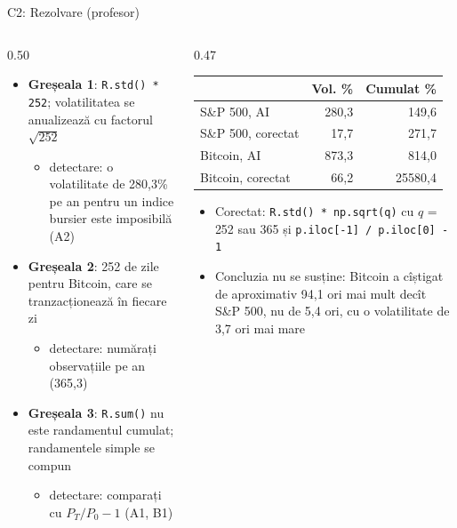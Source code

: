\ifsolutions
\begin{frame}{C2: Rezolvare (profesor)}
\itemsize{\footnotesize}
\begin{columns}[T]
\begin{column}{0.50\textwidth}
\begin{itemize}
    \item \textbf{Greșeala 1}: \texttt{R.std() * 252}; volatilitatea se anualizează cu factorul $\sqrt{252}$
    \begin{itemize}
        \item detectare: o volatilitate de 280{,}3\% pe an pentru un indice bursier este imposibilă (A2)
    \end{itemize}
    \item \textbf{Greșeala 2}: 252 de zile pentru Bitcoin, care se tranzacționează în fiecare zi
    \begin{itemize}
        \item detectare: numărați observațiile pe an (365{,}3)
    \end{itemize}
    \item \textbf{Greșeala 3}: \texttt{R.sum()} nu este randamentul cumulat; randamentele simple se compun
    \begin{itemize}
        \item detectare: comparați cu $P_T/P_0 - 1$ (A1, B1)
    \end{itemize}
\end{itemize}
\end{column}
\begin{column}{0.47\textwidth}
\begin{center}
\footnotesize
\begin{tabular}{lrr}
\toprule
& Vol. \% & Cumulat \% \\
\midrule
S\&P 500, AI & 280{,}3 & 149{,}6 \\
S\&P 500, corectat & 17{,}7 & 271{,}7 \\
Bitcoin, AI & 873{,}3 & 814{,}0 \\
Bitcoin, corectat & 66{,}2 & 25580{,}4 \\
\bottomrule
\end{tabular}
\end{center}
\begin{itemize}
    \item Corectat: \texttt{R.std() * np.sqrt(q)} cu $q$ = 252 sau 365 și \texttt{p.iloc[-1] / p.iloc[0] - 1}
    \item Concluzia nu se susține: Bitcoin a cîștigat de aproximativ 94{,}1 ori mai mult decît S\&P 500, nu de 5{,}4 ori, cu o volatilitate de 3{,}7 ori mai mare
\end{itemize}
\end{column}
\end{columns}
\end{frame}
\fi


